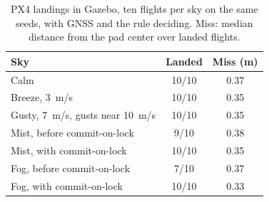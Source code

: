 \begin{table}[t]
\centering\small
\setlength{\tabcolsep}{5pt}
\caption{PX4 landings in Gazebo, ten flights per sky on the same seeds, with GNSS and the rule deciding. Miss: median distance from the pad center over landed flights.}
\label{tab:weather}
\begin{tabular}{lcc}
\toprule
Sky & Landed & Miss (m) \\
\midrule
Calm & 10/10 & 0.37 \\
Breeze, 3~m/s & 10/10 & 0.35 \\
Gusty, 7~m/s, gusts near 10~m/s & 10/10 & 0.35 \\
Mist, before commit-on-lock & 9/10 & 0.38 \\
Mist, with commit-on-lock & 10/10 & 0.35 \\
Fog, before commit-on-lock & 7/10 & 0.37 \\
Fog, with commit-on-lock & 10/10 & 0.33 \\
\bottomrule
\end{tabular}
\end{table}

